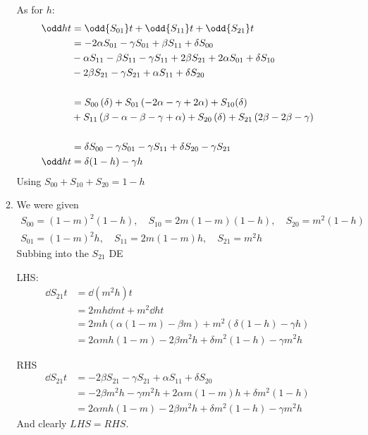 \documentclass{X:/Documents/Coding/Latex/myassignment}
\begin{document}
\begin{enumerate}
\begin{enumerate}
		As for $h$:
		\begin{align*}
			\odd ht &= \odd{S_{01}}t + \odd {S_{11}} t + \odd{S_{21}} t\\
			&=- 2 \alpha S_{01} - \gamma S_{01} +\beta S_{11} + \delta S_{00} \\
			&- \alpha S_{11} -\beta S_{11} - \gamma S_{11} + 2 \beta S_{21} + 2\alpha S_{01} +  \delta S_{10}\\
			&- 2\beta S_{21} - \gamma S_{21} + \alpha S_{11} + \delta S_{20} \\\\
			&=S_{00} \left(\delta \right) + S_{01} \left(-2 \alpha - \gamma + 2 \alpha\right) + S_{10} (\delta) \\
			&+ S_{11} \left(\beta - \alpha - \beta - \gamma + \alpha\right) + S_{20} \left(\delta\right) + S_{21} \left(2 \beta - 2 \beta - \gamma \right)\\\\
			&=\delta S_{00}  - \gamma S_{01} - \gamma S_{11} + \delta S_{20} - \gamma S_{21}\\
			\odd ht &=\delta (1-h) - \gamma h
		\end{align*}
		Using $S_{00} + S_{10} + S_{20} = 1- h$

		\item 
		We were given
		\begin{align*}
			S_{00} = (1-m)^2(1-h), \quad S_{10} = 2m(1-m)(1-h), \quad S_{20} = m^2(1-h)\\
			S_{01} = (1-m)^2h, \quad S_{11} = 2m(1-m)h, \quad S_{21} = m^2h
		\end{align*}
		Subbing into the $S_{21}$ DE

		LHS:
		\begin{align*}
			\dd{S_{21}}{t} &=\dd{(m^2h)}{t}\\
			&=2mh \dd{m}{t} + m^2 \dd ht\\
			&=2mh (\alpha(1-m) - \beta m) + m^2 (\delta (1-h) - \gamma h) \\
			&=2 \alpha mh(1-m) - 2\beta m^2h + \delta m^2  (1-h) -\gamma m^2  h
		\end{align*}

		RHS
		\begin{align*}
			\dd{S_{21}}{t} &= - 2\beta S_{21} - \gamma S_{21} + \alpha S_{11} + \delta S_{20} \\
			&=- 2\beta m^2h - \gamma m^2h + 2\alpha m(1-m)h + \delta m^2(1-h) \\
			&=2 \alpha mh(1-m) - 2\beta m^2h + \delta m^2  (1-h) -\gamma m^2  h
		\end{align*}
		And clearly $LHS = RHS$.


\end{enumerate}
\end{enumerate}
\end{document}
